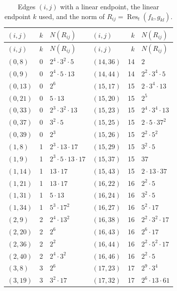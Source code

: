 \documentclass[11pt]{article}
\begin{document}
\begingroup\small
\setlength{\LTcapwidth}{\textwidth}
\begin{longtable}{@{}lrl@{\qquad}lrl@{}}
\caption{Edges $(i,j)$ with a linear endpoint, the linear endpoint $k$ used, and the norm of $R_{ij}=\operatorname{Res}_t(f_k,g_{kl})$.}\label{tab:sep}\\
\hline $(i,j)$ & $k$ & $N(R_{ij})$ & $(i,j)$ & $k$ & $N(R_{ij})$\\\hline\endfirsthead\hline $(i,j)$ & $k$ & $N(R_{ij})$ & $(i,j)$ & $k$ & $N(R_{ij})$\\\hline\endhead\hline\endfoot
$(0,8)$ & 0 & $2^{4}\cdot 3^{2}\cdot 5$ & $(14,36)$ & 14 & $2$\\
$(0,9)$ & 0 & $2^{4}\cdot 5\cdot 13$ & $(14,44)$ & 14 & $2^{2}\cdot 3^{4}\cdot 5$\\
$(0,13)$ & 0 & $2^{6}$ & $(15,17)$ & 15 & $2\cdot 3^{4}\cdot 13$\\
$(0,21)$ & 0 & $5\cdot 13$ & $(15,20)$ & 15 & $2^{5}$\\
$(0,33)$ & 0 & $2^{3}\cdot 3^{2}\cdot 13$ & $(15,23)$ & 15 & $2^{4}\cdot 3^{4}\cdot 13$\\
$(0,37)$ & 0 & $3^{2}\cdot 5$ & $(15,25)$ & 15 & $2\cdot 5\cdot 37^{2}$\\
$(0,39)$ & 0 & $2^{3}$ & $(15,26)$ & 15 & $2^{2}\cdot 5^{2}$\\
$(1,8)$ & 1 & $2^{3}\cdot 13\cdot 17$ & $(15,29)$ & 15 & $3^{2}\cdot 5$\\
$(1,9)$ & 1 & $2^{3}\cdot 5\cdot 13\cdot 17$ & $(15,37)$ & 15 & $37$\\
$(1,14)$ & 1 & $13\cdot 17$ & $(15,43)$ & 15 & $2\cdot 13\cdot 37$\\
$(1,21)$ & 1 & $13\cdot 17$ & $(16,22)$ & 16 & $2^{2}\cdot 5$\\
$(1,31)$ & 1 & $5\cdot 13$ & $(16,24)$ & 16 & $3^{2}\cdot 5$\\
$(1,34)$ & 1 & $5^{3}\cdot 17^{2}$ & $(16,27)$ & 16 & $5^{2}\cdot 17$\\
$(2,9)$ & 2 & $2^{4}\cdot 13^{2}$ & $(16,38)$ & 16 & $2^{2}\cdot 3^{2}\cdot 17$\\
$(2,20)$ & 2 & $2^{6}$ & $(16,43)$ & 16 & $2^{6}\cdot 17$\\
$(2,36)$ & 2 & $2^{2}$ & $(16,44)$ & 16 & $2^{2}\cdot 5^{2}\cdot 17$\\
$(2,40)$ & 2 & $2^{4}\cdot 3^{2}$ & $(16,46)$ & 16 & $2^{2}\cdot 5$\\
$(3,8)$ & 3 & $2^{6}$ & $(17,23)$ & 17 & $2^{9}\cdot 3^{4}$\\
$(3,19)$ & 3 & $3^{2}\cdot 17$ & $(17,32)$ & 17 & $2^{6}\cdot 13\cdot 61$\\

\end{longtable}
\end{document}
